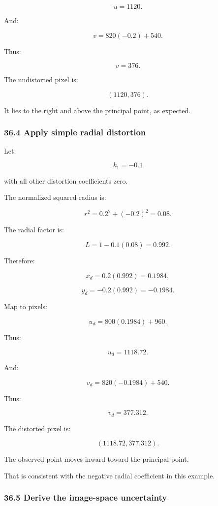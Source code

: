 \[
 \boxed{u=1120}.
\]

And:

\[
 v=820(-0.2)+540.
\]

Thus:

\[
 \boxed{v=376}.
\]

The undistorted pixel is:

\[
 \boxed{(1120,376)}.
\]

It lies to the right and above the principal point, as expected.

\subsubsection{36.4 Apply simple radial distortion}\label{02-foundations-ii-ch037-apply-simple-radial-distortion}

\hypertarget{02-foundations-ii-ch037-apply-simple-radial-distortion}{}

Let:

\[
 k_1=-0.1
\]

with all other distortion coefficients zero.

The normalized squared radius is:

\[
 r^2=0.2^2+(-0.2)^2=0.08.
\]

The radial factor is:

\[
 L=1-0.1(0.08)=0.992.
\]

Therefore:

\[
 x_d=0.2(0.992)=0.1984,
\]

\[
 y_d=-0.2(0.992)=-0.1984.
\]

Map to pixels:

\[
 u_d=800(0.1984)+960.
\]

Thus:

\[
 \boxed{u_d=1118.72}.
\]

And:

\[
 v_d=820(-0.1984)+540.
\]

Thus:

\[
 \boxed{v_d=377.312}.
\]

The distorted pixel is:

\[
 \boxed{(1118.72,377.312)}.
\]

The observed point moves inward toward the principal point.

That is consistent with the negative radial coefficient in this example.

\subsubsection{36.5 Derive the image-space uncertainty}\label{02-foundations-ii-ch037-derive-the-image-space-uncertainty}


